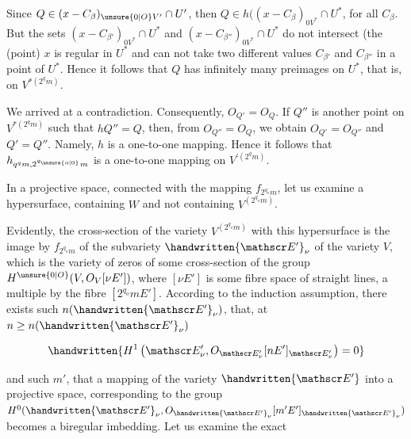 
Since $Q\in(x-C_\beta)_{\unsure{0|O}V'}\cap  U'$, then $Q\in h((x-C_\beta)_{0V^*}\cap  U^*$,
for all $C_\beta$. But the sets $(x-C_{\beta'})_{0V^*}\cap  U^*$ and
$(x-C_{\beta''})_{0V^*}\cap  U^*$ do not intersect (the (point) $x$ is regular
in $U^*$ and can not take two different values $C_{\beta'}$ and $C_{\beta''}$
in a point of $U^*$. Hence it follows that $Q$ has infinitely
many preimages on $U^*$, that is, on $V^{*(2^q m)}$.

We arrived at a contradiction. Consequently, $O_{Q'}=O_Q$.
If $Q''$ is another point on $V^{*(2^q m)}$ such that $hQ''=Q$,
then, from $O_{Q''}=O_Q$, we obtain $O_{Q'}=O_{Q''}$ and $Q'=Q''$.
Namely, $h$ is a one\deleted{\unsure{=}}-to-one mapping. Hence it follows that
$h_{q^q m,2^{q_{\unsure{o|0}}}m}$ is a one-to-one mapping on $V^{'(2^q m)}$.

In a projective space, connected with the mapping $f_{2^{q_o}m}$,
let us examine a hypersurface, containing $W$ and not
containing $V^{(2^{q_o}m)}$.

Evidently, the cross-section of the variety $V^{(2^{q_o}m)}$
with this hypersurface is the image by $f_{2^{q_o}m}$ of the
subvariety $\handwritten{\mathscr E'}_\nu$ of the variety $V$, which is the variety of
zeros of some cross-section of the group $H^{\unsure{0|O}}(V,O_V[\nu  E'])$,
where $[\nu  E']$ is some fibre space of straight lines, a
multiple by the fibre $[2^{q_o}mE']$. According to the induction
assumption, there exists such $n(\handwritten{\mathscr E'}_\nu)$, that, at $n\geq n(\handwritten{\mathscr E'}_\nu)$

\[
\handwritten{H^1\left(\mathscr E'_\nu,O_{\mathscr E'_\nu}[nE']_{\mathscr E'_\nu}\right)=0}
\]

and such $m'$, that a mapping of the variety $\handwritten{\mathscr E'}$ into a
projective space, corresponding to the group $H^0(\handwritten{\mathscr E'}_\nu,O_{\handwritten{\mathscr E'}_\nu}[m'E']_{\handwritten{\mathscr E'}_\nu})$
becomes a biregular imbedding. Let us examine the exact

